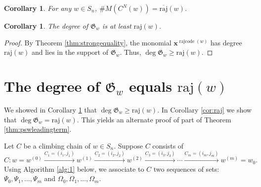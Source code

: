 \documentclass[11pt]{amsart}
\newtheorem{corollary}[theorem]{Corollary}
\theoremstyle{definition}
\theoremstyle{named}
\newcommand{\CN}{C^N}
\DeclareMathOperator{\rr}{\mathrm{rajcode}} %
\newcommand{\absrajcode}[1]{\mathrm{raj}(#1)}
\newcommand{\absoverrajcode}[1]{\overline{\mathrm{raj}}(#1)}
\begin{document}
	\begin{corollary}
		\label{cor:weakequality}		
		For any $w\in S_n$, $\#M(\CN(w)) = \absoverrajcode{w}$.
	\end{corollary}

	\begin{corollary} 
		\label{cor:deg>=}
		The degree of $\mathfrak{G}_w$ is at least $\absrajcode{w}$.
	\end{corollary}
	\begin{proof}
		By Theorem \ref{thm:strongequality}, the monomial $\bm{x}^{\rr(w)}$ has degree $\absrajcode{w}$ and lies in the support of $\mathfrak{G}_w$. Thus, $\deg\mathfrak{G}_w\geq \absrajcode{w}$. 
	\end{proof}


	\section{The degree of $\mathfrak{G}_w$ equals $\absrajcode{w}$}
	\label{sec:raj}

	We showed in Corollary \ref{cor:deg>=} that $\deg\mathfrak{G}_w\geq \absrajcode{w}$. In Corollary \ref{cor:raj} we show that $\deg\mathfrak{G}_w= \absrajcode{w}$. This yields an alternate proof of part of Theorem \ref{thm:pswleadingterm}.
	\medskip

	Let $C$ be a climbing chain of $w\in S_n$. Suppose $C$ consists of
	\[C: w=w^{(0)} \xrightarrow{C_1=(i_1,j_1)} w^{(1)} \xrightarrow{C_2=(i_2,j_2)} w^{(2)}\xrightarrow{C_3=(i_3,j_3)}\cdots\xrightarrow{C_m=(i_m,j_m)} w^{(m)} = w_0. \]
	Using Algorithm \ref{alg:1} below, we associate to $C$ two sequences of sets: $\Psi_0,\Psi_1,\ldots,\Psi_m$ and $\Omega_0,\Omega_1,\ldots,\Omega_m$.
\end{document}
